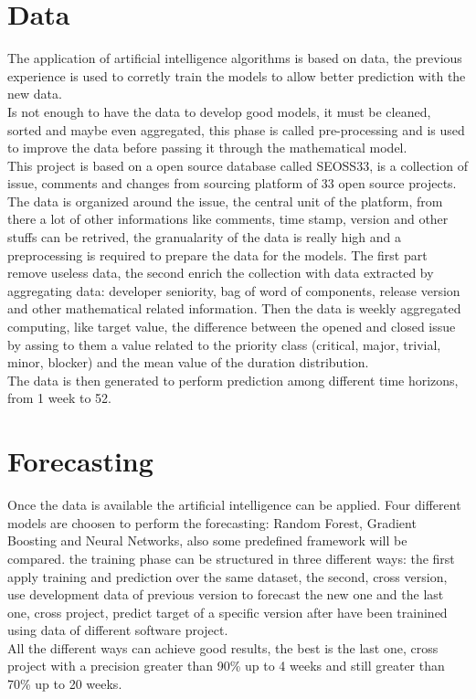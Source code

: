 \documentclass{article}
\begin{document}
\section{Data}
The application of artificial intelligence algorithms is based on data, the previous experience is used to corretly train the models to allow better prediction with the new data.\\
Is not enough to have the data to develop good models, it must be cleaned, sorted and maybe even aggregated, this phase is called pre-processing and is used to improve the data before passing it through the mathematical model.\\
This project is based on a open source database called SEOSS33, is a collection of issue, comments and changes from sourcing platform of 33 open source projects. The data is organized around the issue, the central unit of the platform, from there a lot of other informations like comments, time stamp, version and other stuffs can be retrived, the granualarity of the data is really high and a preprocessing is required to prepare the data for the models. The first part remove useless data, the second enrich the collection with data extracted by aggregating data: developer seniority, bag of word of components, release version and other mathematical related information. Then the data is weekly aggregated computing, like target value, the difference between the opened and closed issue by assing to them a value related to the priority class (critical, major, trivial, minor, blocker) and the mean value of the duration distribution.\\
The data is then generated to perform prediction among different time horizons, from 1 week to 52.

\section{Forecasting}
Once the data is available the artificial intelligence can be applied. Four different models are choosen to perform the forecasting: Random Forest, Gradient Boosting and Neural Networks, also some predefined framework will be compared. the training phase can be structured in three different ways: the first apply training and prediction over the same dataset, the second, cross version, use development data of previous version to forecast the new one and the last one, cross project, predict target of a specific version after have been trainined using data of different software project.\\
All the different ways can achieve good results, the best is the last one, cross project with a precision greater than 90\% up to 4 weeks and still greater than 70\% up to 20 weeks. 
\end{document}
